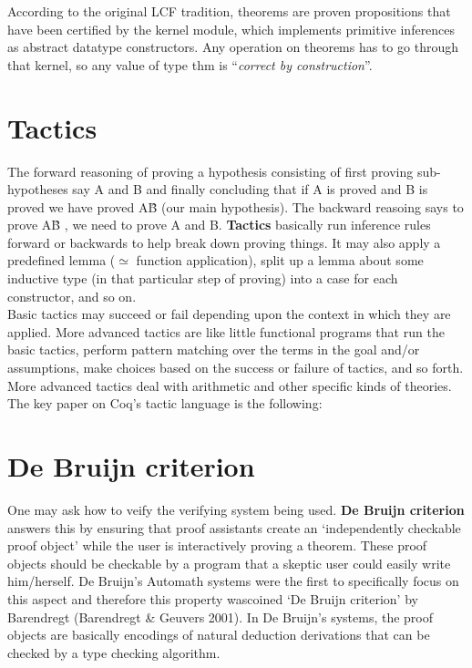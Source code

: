 According to the original LCF tradition, theorems are proven propositions that have been certified by the kernel module, which implements primitive inferences as abstract datatype constructors. Any operation on theorems has to go through that kernel, so any value of type thm is “\textit{correct by construction}”.

\section{Tactics}
The forward reasoning of proving a hypothesis consisting of first proving sub-hypotheses say A and B and finally concluding that if A is proved and B is proved we have proved A\^B (our main hypothesis). The backward reasoing says to prove A\^B , we need to prove A and B. \textbf{Tactics} basically run inference rules forward or backwards to help break down proving things. It may also apply a predefined lemma ($\simeq$ function application), split up a lemma about some inductive type (in that particular step of proving) into a case for each constructor, and so on. \\

Basic tactics may succeed or fail depending upon the context in which they are applied. More advanced tactics are like little functional programs that run the basic tactics, perform pattern matching over the terms in the goal and/or assumptions, make choices based on the success or failure of tactics, and so forth. More advanced tactics deal with arithmetic and other specific kinds of theories. The key paper on Coq's tactic language is the following:

\section{De Bruijn criterion}
One may ask how to veify the verifying system being used. \textbf{De Bruijn criterion} answers this by ensuring that proof assistants create an ‘independently checkable proof object’ while the user is interactively proving a theorem. These proof objects should be checkable by a program that a skeptic user could easily write him/herself. De Bruijn’s Automath systems were the first to specifically focus on this aspect and therefore this property wascoined ‘De Bruijn criterion’ by Barendregt (Barendregt \& Geuvers 2001). In De Bruijn’s systems, the proof objects are basically encodings of natural deduction derivations that can be checked by a type checking algorithm.\\

